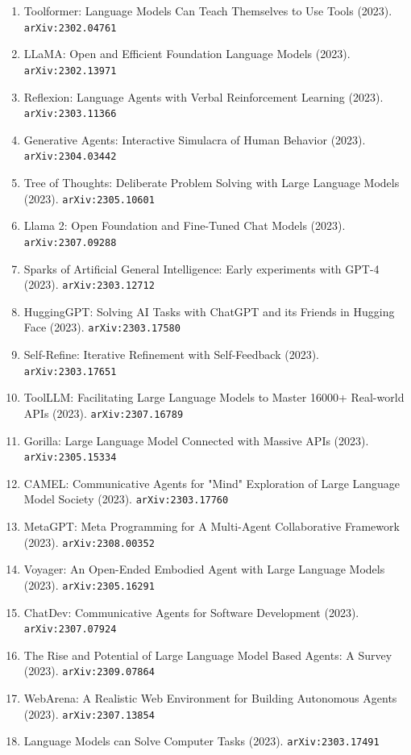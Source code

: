 \documentclass[11pt]{article}
\begin{document}
\begin{enumerate}
  \item Toolformer: Language Models Can Teach Themselves to Use Tools (2023). \texttt{arXiv:2302.04761}
  \item LLaMA: Open and Efficient Foundation Language Models (2023). \texttt{arXiv:2302.13971}
  \item Reflexion: Language Agents with Verbal Reinforcement Learning (2023). \texttt{arXiv:2303.11366}
  \item Generative Agents: Interactive Simulacra of Human Behavior (2023). \texttt{arXiv:2304.03442}
  \item Tree of Thoughts: Deliberate Problem Solving with Large Language Models (2023). \texttt{arXiv:2305.10601}
  \item Llama 2: Open Foundation and Fine-Tuned Chat Models (2023). \texttt{arXiv:2307.09288}
  \item Sparks of Artificial General Intelligence: Early experiments with GPT-4 (2023). \texttt{arXiv:2303.12712}
  \item HuggingGPT: Solving AI Tasks with ChatGPT and its Friends in Hugging
  Face (2023). \texttt{arXiv:2303.17580}
  \item Self-Refine: Iterative Refinement with Self-Feedback (2023). \texttt{arXiv:2303.17651}
  \item ToolLLM: Facilitating Large Language Models to Master 16000+ Real-world
  APIs (2023). \texttt{arXiv:2307.16789}
  \item Gorilla: Large Language Model Connected with Massive APIs (2023). \texttt{arXiv:2305.15334}
  \item CAMEL: Communicative Agents for "Mind" Exploration of Large Language
  Model Society (2023). \texttt{arXiv:2303.17760}
  \item MetaGPT: Meta Programming for A Multi-Agent Collaborative Framework (2023). \texttt{arXiv:2308.00352}
  \item Voyager: An Open-Ended Embodied Agent with Large Language Models (2023). \texttt{arXiv:2305.16291}
  \item ChatDev: Communicative Agents for Software Development (2023). \texttt{arXiv:2307.07924}
  \item The Rise and Potential of Large Language Model Based Agents: A Survey (2023). \texttt{arXiv:2309.07864}
  \item WebArena: A Realistic Web Environment for Building Autonomous Agents (2023). \texttt{arXiv:2307.13854}
  \item Language Models can Solve Computer Tasks (2023). \texttt{arXiv:2303.17491}

\end{enumerate}
\end{document}
